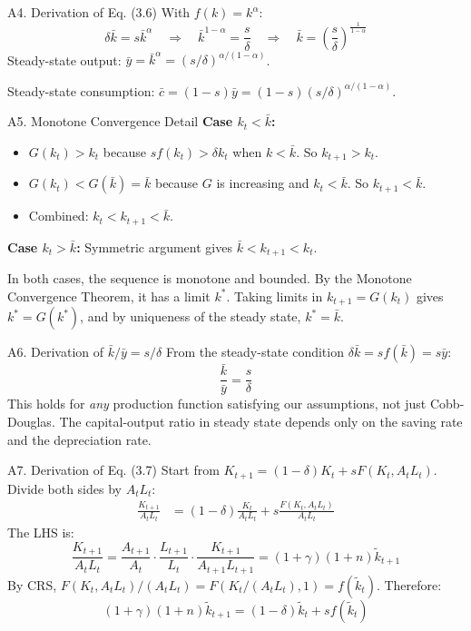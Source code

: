 \documentclass[aspectratio=169,10pt]{beamer}
\newcommand{\backbutton}[1]{\hfill\hyperlink{#1}{\beamerbutton{Back}}}
\begin{document}
\begin{frame}{A4. Derivation of Eq. (3.6)}
\hypertarget{a4}{}
With $f(k)=k^{\alpha}$:
\[
\delta\bar{k}=s\bar{k}^{\alpha}
\quad\Rightarrow\quad \bar{k}^{1-\alpha}=\frac{s}{\delta}
\quad\Rightarrow\quad \bar{k}=\left(\frac{s}{\delta}\right)^{\frac{1}{1-\alpha}}
\]
Steady-state output: $\bar{y} = \bar{k}^{\alpha} = (s/\delta)^{\alpha/(1-\alpha)}$.

Steady-state consumption: $\bar{c} = (1-s)\bar{y} = (1-s)(s/\delta)^{\alpha/(1-\alpha)}$.
\backbutton{m-a4}
\end{frame}

\begin{frame}{A5. Monotone Convergence Detail}
\hypertarget{a5}{}
\textbf{Case $k_t<\bar{k}$:}
\begin{itemize}
  \item $G(k_t) > k_t$ because $sf(k_t) > \delta k_t$ when $k<\bar{k}$. So $k_{t+1} > k_t$.
  \item $G(k_t) < G(\bar{k}) = \bar{k}$ because $G$ is increasing and $k_t < \bar{k}$. So $k_{t+1} < \bar{k}$.
  \item Combined: $k_t < k_{t+1} < \bar{k}$.
\end{itemize}

\textbf{Case $k_t>\bar{k}$:} Symmetric argument gives $\bar{k} < k_{t+1} < k_t$.

\medskip
In both cases, the sequence is monotone and bounded. By the Monotone Convergence Theorem, it has a limit $k^*$. Taking limits in $k_{t+1}=G(k_t)$ gives $k^*=G(k^*)$, and by uniqueness of the steady state, $k^*=\bar{k}$.
\backbutton{m-a5}
\end{frame}

\begin{frame}{A6. Derivation of $\bar{k}/\bar{y}=s/\delta$}
\hypertarget{a6}{}
From the steady-state condition $\delta\bar{k}=s f(\bar{k}) = s\bar{y}$:
\[
\frac{\bar{k}}{\bar{y}}=\frac{s}{\delta}
\]
This holds for \emph{any} production function satisfying our assumptions, not just Cobb-Douglas. The capital-output ratio in steady state depends only on the saving rate and the depreciation rate.
\backbutton{m-a6}
\end{frame}

\begin{frame}{A7. Derivation of Eq. (3.7)}
\hypertarget{a7}{}
Start from $K_{t+1} = (1-\delta)K_t + sF(K_t,A_tL_t)$. Divide both sides by $A_tL_t$:
\begin{align*}
\frac{K_{t+1}}{A_tL_t} &= (1-\delta)\frac{K_t}{A_tL_t}+s\frac{F(K_t,A_tL_t)}{A_tL_t}
\end{align*}
The LHS is:
\[
\frac{K_{t+1}}{A_tL_t} = \frac{A_{t+1}}{A_t}\cdot\frac{L_{t+1}}{L_t}\cdot\frac{K_{t+1}}{A_{t+1}L_{t+1}} = (1+\gamma)(1+n)\tilde{k}_{t+1}
\]
By CRS, $F(K_t,A_tL_t)/(A_tL_t) = F(K_t/(A_tL_t),1) = f(\tilde{k}_t)$. Therefore:
\[
(1+\gamma)(1+n)\tilde{k}_{t+1}=(1-\delta)\tilde{k}_t+s f(\tilde{k}_t)
\]
\backbutton{m-a7}
\end{frame}
\end{document}
